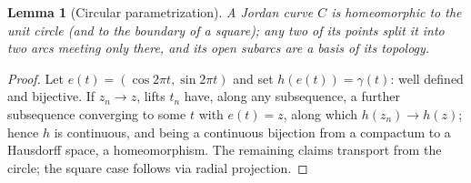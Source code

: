 \documentclass[11pt,a4paper]{article}
\theoremstyle{jsplain}
\newtheorem{lemma}[theorem]{Lemma}
\theoremstyle{jsdefn}
\begin{document}
\begin{lemma}[Circular parametrization]\label{lem:circle}
A Jordan curve $C$ is homeomorphic to the unit circle (and to the
boundary of a square); any two of its points split it into two arcs
meeting only there, and its open subarcs are a basis of its topology.
\end{lemma}
\begin{proof}
Let $e(t)=(\cos2\pi t,\sin2\pi t)$ and set $h(e(t))=\gamma(t)$: well
defined and bijective. If $z_n\to z$, lifts $t_n$ have, along any
subsequence, a further subsequence converging to some $t$ with
$e(t)=z$, along which $h(z_n)\to h(z)$; hence $h$ is continuous, and
being a continuous bijection from a compactum to a Hausdorff space, a
homeomorphism. The remaining claims transport from the circle; the
square case follows via radial projection.
\end{proof}
\end{document}
